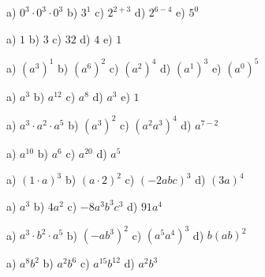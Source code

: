     \begin{tehtava}
        a) $0^3\cdot0^3\cdot0^3$ \qquad
        b) $3^1$ \qquad
        c) $2^{2+3}$ \qquad
        d) $2^{6-4}$ \qquad
        e) $5^0$

        \begin{vastaus}
            a) $1$ \qquad
            b) $3$ \qquad
            c) $32$ \qquad
            d) $4$ \qquad
            e) $1$
        \end{vastaus}
    \end{tehtava}
    \begin{tehtava}
        a) $(a^3)^1$ \qquad
        b) $(a^6)^2$ \qquad
        c) $(a^2)^4$ \qquad 
        d) $(a^1)^3$ \qquad
        e) $(a^0)^5$

        \begin{vastaus}
            a) $a^3$ \qquad
            b) $a^{12}$ \qquad
            c) $a^8$ \qquad
            d) $a^3$ \qquad
            e) $1$
        \end{vastaus}
    \end{tehtava}
    \begin{tehtava}
        a) $a^3\cdot a^2\cdot a^5$ \qquad
        b) $(a^3)^2$ \qquad
        c) $(a^2a^3)^4$ \qquad
        d) $a^{7-2}$

        \begin{vastaus}
            a) $a^{10}$ \qquad
            b) $a^6$ \qquad
            c) $a^{20}$ \qquad
            d) $a^5$
        \end{vastaus}
    \end{tehtava}
    \begin{tehtava}
        a) $(1\cdot a)^3$ \qquad
        b) $(a\cdot 2)^2$ \qquad
        c) $(-2abc)^3$ \qquad
        d) $(3a)^4$

        \begin{vastaus}
            a) $a^3$ \qquad
            b) $4a^2$ \qquad
            c) $-8a^3b^3c^3$ \qquad
            d) $91a^4$
        \end{vastaus}
    \end{tehtava}

    \begin{tehtava}
        a) $a^3\cdot b^2\cdot a^5$ \qquad
        b) $(-ab^3)^2$ \qquad
        c) $(a^5a^4)^3$ \qquad
        d) $b(ab)^2$

        \begin{vastaus}
            a) $a^8b^2$ \qquad
            b) $a^2b^6$ \qquad
            c) $a^{15}b^{12}$ \qquad
            d) $a^2b^3$
        \end{vastaus}
    \end{tehtava}

